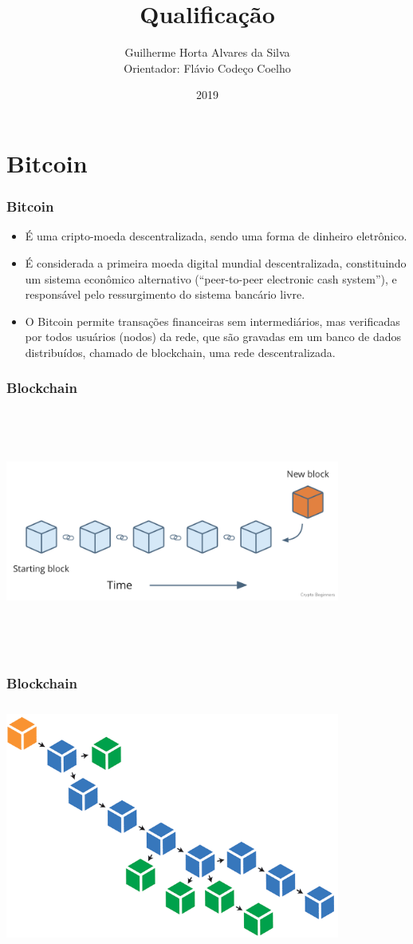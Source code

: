 \documentclass{beamer}
\title{Qualificação}
\author[Guilherme, Flávio]{Guilherme Horta Alvares da Silva \\
  Orientador: Flávio Codeço Coelho}
\institute{Fundação Getulio Vargas}
\date{2019}
\begin{document}
 
\frame{\titlepage}

\section{Bitcoin}

\begin{frame}
\frametitle{Bitcoin}
\begin{itemize}
    \item É uma cripto-moeda descentralizada, sendo uma forma de dinheiro eletrônico.
    \item É considerada a primeira moeda digital mundial descentralizada, constituindo um sistema econômico alternativo (\foreignquote{english}{peer-to-peer electronic cash system}), e responsável pelo ressurgimento do sistema bancário livre.
    \item O Bitcoin permite transações financeiras sem intermediários, mas verificadas por todos usuários (nodos) da rede, que são gravadas em um banco de dados distribuídos, chamado de blockchain, uma rede descentralizada.
\end{itemize}
\end{frame}

\begin{frame}
\frametitle{Blockchain}
\includegraphics[width=11cm, height=8cm]{blockchain1}
\end{frame}

\begin{frame}
\frametitle{Blockchain}
\includegraphics[width=11cm, height=8cm]{blockchain2}
\end{frame}
\end{document}
